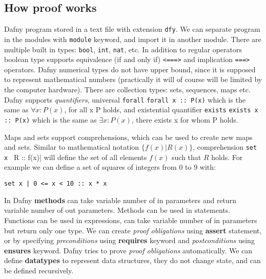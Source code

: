 \subsection{How proof works}
Dafny program stored in a text file with extension \texttt{dfy}. We can separate program in the modules with \texttt{module} keyword, and import it in another module. There are multiple built in types: \texttt{bool}, \texttt{int}, \texttt{nat}, etc. In addition to regular operators boolean type supports equivalence (if and only if) \texttt{<===>} and implication \texttt{===>} operators. Dafny numerical types do not have upper bound, since it is supposed to represent mathematical numbers (practically it will of course will be limited by the computer hardware). There are collection types: sets, sequences, maps etc. Dafny supports \textit{quantifiers}, universal \texttt{forall}
\verb|forall x :: P(x)|
which is the same as $\forall{x}: P(x)$, for all x P holds, and existential quantifier \texttt{exists}
\verb|exists x :: P(x)|
which is the same as $\exists{x}: P(x)$, there exists x for whom P holds.

Maps and sets support comprehensions, which can be used to create new maps and sets. Similar to mathematical notation $\{f(x) | R(x)\}$, comprehension
\verb|set x | R :: f(x)| will define the set of all elements $f(x)$ such that $R$ holds. For example we can define a set of squares of integers from 0 to 9 with:
\begin{lstlisting}[language=DafnyJS,caption={Set comprehension},label={lst:comprehension}]
set x | 0 <= x < 10 :: x * x
\end{lstlisting}

In Dafny \textbf{methods} can take variable number of in parameters and return variable number of out parameters. Methods can be used in statements. Functions can be used in expressions, can take variable number of in parameters but return only one type. We can create \textit{proof obligations} using \textbf{assert} statement, or by specifying \textit{preconditions} using \textbf{requires} keyword and \textit{postconditions} using \textbf{ensures} keyword. Dafny tries to prove \textit{proof obligations} automatically.
We can define \textbf{datatypes} to represent data structures, they do not change state, and can be defined recursively.

